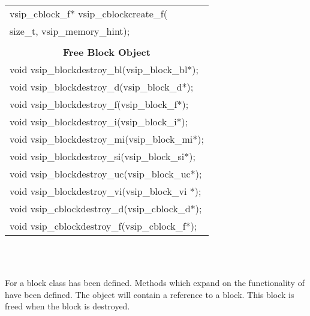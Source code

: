 {{\begin{tabular}[H]{l}
vsip\_cblock\_f* vsip\_cblockcreate\_f(\\*\hspace{1cm}size\_t, vsip\_memory\_hint);\vspace{.2cm}\\ 
\hline\hline\\
\multicolumn{1}{c}{\rmfamily \bfseries Free Block Object\vspace{.1cm}}\\\hline
void vsip\_blockdestroy\_bl(vsip\_block\_bl*);\\
void vsip\_blockdestroy\_d(vsip\_block\_d*);\\
void vsip\_blockdestroy\_f(vsip\_block\_f*);\\
void vsip\_blockdestroy\_i(vsip\_block\_i*);\\
void vsip\_blockdestroy\_mi(vsip\_block\_mi*);\\
void vsip\_blockdestroy\_si(vsip\_block\_si*);\\
void vsip\_blockdestroy\_uc(vsip\_block\_uc*);\\
void vsip\_blockdestroy\_vi(vsip\_block\_vi *);\\
void vsip\_cblockdestroy\_d(vsip\_cblock\_d*);\\
void vsip\_cblockdestroy\_f(vsip\_cblock\_f*);\\
\end{tabular}
}}
\\\pyjvsiph
\\ \hspace*{.8cm}\parbox{.9\textwidth}{For \pyjv{} a block class has been defined. Methods which expand on the functionality of \cvl{} have been defined.  The  object will contain a reference to a \cvl{} block. This block is freed when the \pyjv{} block is destroyed.}
